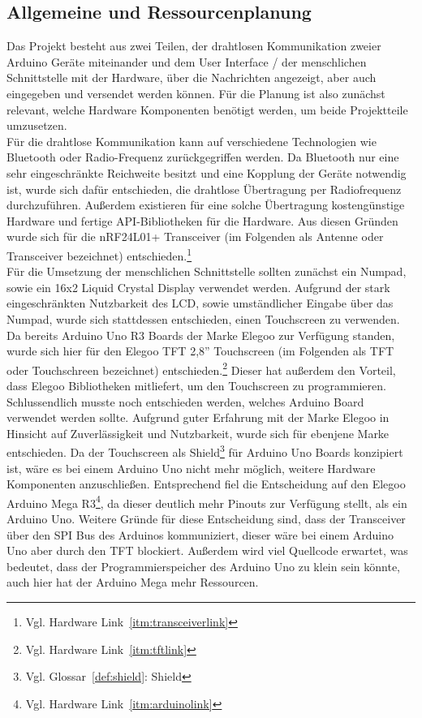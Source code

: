 \documentclass[a4paper, 11pt]{scrartcl}
\begin{document}
\subsection{Allgemeine und Ressourcenplanung}\label{ch:planning}
Das Projekt besteht aus zwei Teilen, der drahtlosen Kommunikation zweier Arduino Geräte miteinander und dem User Interface / der menschlichen Schnittstelle mit der
Hardware, über die Nachrichten angezeigt, aber auch eingegeben und versendet werden können. Für die Planung ist also zunächst relevant, welche Hardware Komponenten benötigt werden, 
um beide Projektteile umzusetzen.
\\
Für die drahtlose Kommunikation kann auf verschiedene Technologien wie Bluetooth oder Radio-Frequenz zurückgegriffen werden. Da Bluetooth nur eine sehr eingeschränkte
Reichweite besitzt und eine Kopplung der Geräte notwendig ist, wurde sich dafür entschieden, die drahtlose Übertragung per Radiofrequenz durchzuführen. Außerdem existieren
für eine solche Übertragung kostengünstige Hardware und fertige API-Bibliotheken für die Hardware. Aus diesen Gründen wurde sich für die nRF24L01+ Transceiver 
(im Folgenden als \glqq Antenne\grqq{} oder \glqq Transceiver\grqq{} bezeichnet) entschieden.\footnote{Vgl. Hardware Link~\ref{itm:transceiverlink}}
\\
Für die Umsetzung der menschlichen Schnittstelle sollten zunächst ein Numpad, sowie ein 16x2 Liquid Crystal Display verwendet werden. Aufgrund der stark eingeschränkten Nutzbarkeit des LCD,
sowie umständlicher Eingabe über das Numpad, wurde sich stattdessen entschieden, einen Touchscreen zu verwenden. Da bereits Arduino Uno R3 Boards der Marke Elegoo zur Verfügung standen,
wurde sich hier für den Elegoo TFT 2,8'' Touchscreen (im Folgenden als \glqq TFT\grqq{} oder \glqq Touchschreen\grqq{} bezeichnet) entschieden.\footnote{Vgl. Hardware Link~\ref{itm:tftlink}} Dieser
hat außerdem den Vorteil, dass Elegoo Bibliotheken mitliefert, um den Touchscreen zu programmieren.
\\
Schlussendlich musste noch entschieden werden, welches Arduino Board verwendet werden sollte. Aufgrund guter Erfahrung mit der Marke Elegoo in Hinsicht auf Zuverlässigkeit und Nutzbarkeit, wurde sich für
ebenjene Marke entschieden. Da der Touchscreen als Shield\footnote{Vgl. Glossar~\ref{def:shield}: Shield} für Arduino Uno Boards konzipiert ist, wäre es bei einem Arduino Uno nicht mehr möglich,
weitere Hardware Komponenten anzuschließen. Entsprechend fiel die Entscheidung auf den Elegoo Arduino Mega R3\footnote{Vgl. Hardware Link~\ref{itm:arduinolink}}, da dieser deutlich mehr Pinouts zur Verfügung
stellt, als ein Arduino Uno. Weitere Gründe für diese Entscheidung sind, dass der Transceiver über den SPI Bus des Arduinos kommuniziert, dieser wäre bei einem Arduino Uno aber durch den TFT blockiert. Außerdem
wird viel Quellcode erwartet, was bedeutet, dass der Programmierspeicher des Arduino Uno zu klein sein könnte, auch hier hat der Arduino Mega mehr Ressourcen.
\end{document}
